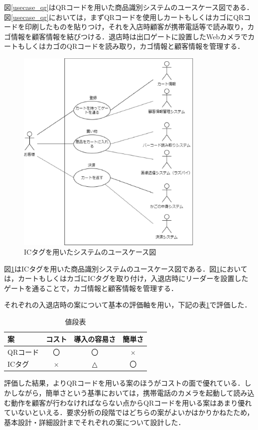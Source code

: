 図\ref{usecase_qr}はQRコードを用いた商品識別システムのユースケース図である．図\ref{usecase_qr}においては，まずQRコードを使用しカートもしくはカゴにQRコードを印刷したものを貼りつけ，それを入店時顧客が携帯電話等で読み取り，カゴ情報を顧客情報を結びつける．退店時は出口ゲートに設置したWebカメラでカートもしくはカゴのQRコードを読み取り，カゴ情報と顧客情報を管理する．


\begin{figure}[htbp]
\centering
\includegraphics[width = 9cm]{./picture/usecase_ic.eps}
\caption{ICタグを用いたシステムのユースケース図}
\label{usecase_ic}
\end{figure}

図\ref{usecase_ic}はICタグを用いた商品識別システムのユースケース図である．図\ref{usecase_ic}においては，カートもしくはカゴにICタグを取り付け，入退店時にリーダーを設置したゲートを通ることで，カゴ情報と顧客情報を管理する．


それぞれの入退店時の案について基本の評価軸を用い，下記の表\ref{test}で評価した．


\begin{table}[htb]
\begin{center}
\caption{値段表}
\begin{tabular}{|l||c|c|c|} \hline
案 & コスト & 導入の容易さ & 簡単さ \\ \hline \hline
QRコード & 〇 & 〇 & × \\
ICタグ & × & △ & 〇 \\ \hline
\end{tabular}
\label{test}
  \end{center}
\end{table}


評価した結果，よりQRコードを用いる案のほうがコストの面で優れている．しかしながら，簡単さという基準においては，携帯電話のカメラを起動して読み込む動作を顧客が行わなければならない点からQRコードを用いる案はあまり優れていないといえる．要求分析の段階ではどちらの案がよいかはかりかねたため，基本設計・詳細設計までそれぞれの案について設計した．